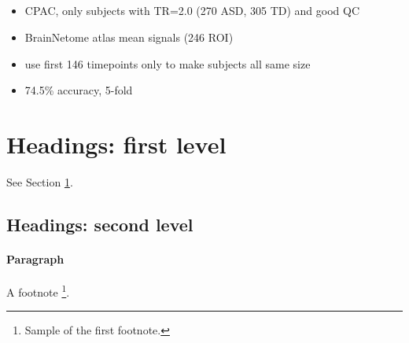 \documentclass[10pt]{article}
\begin{document}
\subsection{\citet{byeonArtificialNeuralNetwork2020}}

\begin{itemize}
  \item CPAC, only subjects with TR=2.0 (270 ASD, 305 TD) and good QC
  \item BrainNetome atlas mean signals (246 ROI)
  \item use first 146 timepoints only to make subjects all same size
  \item 74.5\% accuracy, 5-fold
\end{itemize}

\section{Headings: first level}
\label{sec:headings}

See Section \ref{sec:headings}.

\subsection{Headings: second level}
\paragraph{Paragraph}

A footnote \footnote{Sample of the first footnote.}.



\end{document}
